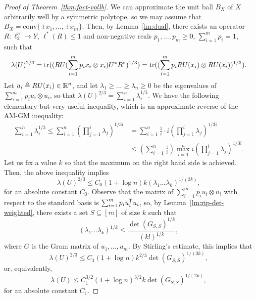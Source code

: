 \begin{proof}[Proof of Theorem~\ref{thm:fact-vollb}]
  We can approximate the unit ball $B_X$ of $X$ arbitrarily well by a
  symmetric polytope, so we may assume that $B_X = \mathrm{conv}\{\pm
  x_1, \ldots, \pm x_m\}$. Then, by Lemma~\ref{lm:dual}, there exists an
  operator $R: \ell_2^n \to Y$, $\ell^*(R) \le 1$ and non-negative
  reals $p_1, \ldots, p_m \ge 0$, $\sum_{i = 1}^m{p_i} = 1$, such that
  \[
  \lambda(U)^{2/3} 
  = \operatorname{tr}((RU(\sum_{i = 1}^m{p_i x_i  \otimes  x_i})U^*R^*)^{1/3})
  = \operatorname{tr}((\sum_{i = 1}^m{p_i RU(x_i)  \otimes  RU(x_i)})^{1/3}).
  \]
  Let $u_i \triangleq RU(x_i) \in {\mathbb{R}}^n$, and let $\lambda_1 \ge \ldots \ge
  \lambda_n \ge 0$ be the eigenvalues of $\sum_{i = 1}^m{p_i u_i
    \otimes u_i}$, so that $\lambda(U)^{2/3} = \sum_{i =
    1}^n{\lambda_i^{1/3}}$. We have the following elementary but very useful
  inequality, which is an approximate reverse of the AM-GM inequality:
  \begin{align*}
  \sum_{i = 1}^n{\lambda_i^{1/3}} \le 
  \sum_{i = 1}^n{\left(\prod_{j = 1}^i{\lambda_j}\right)^{1/3i}}
  &= \sum_{i = 1}^n{\frac{1}{i} \cdot i\left(\prod_{j =   1}^i{\lambda_j}\right)^{1/3i}}\\
  &\le \left(\sum_{i = 1}^n{\frac{1}{i}}\right) 
  \max_{i = 1}^n{i\left(\prod_{j =   1}^i{\lambda_j}\right)^{1/3i}}.
  \end{align*}
  Let us fix a value $k$ so that the maximum on the right hand side is
  achieved. Then, the above inequality implies
  \[
  \lambda(U)^{2/3} \le C_0 (1+\log n) k (\lambda_1 \ldots \lambda_k)^{1/(3k)},
  \]
  for an absolute constant $C_0$. Observe that the matrix of $\sum_{i
    = 1}^m{p_i u_i \otimes u_i}$ with respect to the standard basis is
  $\sum_{i = 1}^m{p_i u_i^\mathsf T u_i}$, so, by
  Lemma~\ref{lm:rip-det-weighted},  there exists a set $S
  \subseteq [m]$ of size $k$ such that
  \[
  (\lambda_1 \ldots \lambda_k)^{1/k} \le
  \frac{\det(G_{S,S})^{1/k}}{(k!)^{1/k}},
  \]
  where $G$ is the Gram matrix of $u_1, \ldots, u_m$. By Stirling's
  estimate, this implies that 
  \begin{equation*}
  \lambda(U)^{2/3} \le C_1 (1+\log n) k^{2/3} \det(G_{S,S})^{1/(3k)},
  \end{equation*}
  or, equivalently,
  \begin{equation}\label{eq:fact-det}
  \lambda(U)\le  C_1^{3/2} (1+\log n)^{3/2} k \det(G_{S,S})^{1/(2k)},
  \end{equation}
  for an absolute constant $C_1$. 


\end{proof}
